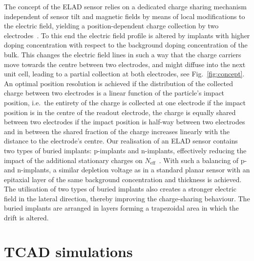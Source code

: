 \documentclass[a4paper,11pt]{article}
\begin{document}
The concept of the ELAD sensor relies on a dedicated charge sharing mechanism independent of sensor tilt and magnetic fields by means of local modifications to the electric field,
 yielding a position-dependent charge collection by two electrodes~\cite{hj}.
To this end the electric field profile is altered by implants with higher doping concentration with respect to the background doping concentration of the bulk. 
This changes the electric field lines in such a way that the charge carriers move towards the centre between two electrodes, and might diffuse into the next unit cell, leading to a partial collection at both electrodes,
 see Fig.~\ref{fig:concept}.
An optimal position resolution is achieved if the distribution of the collected charge between two electrodes is a linear function of the particle's impact position, 
 i.e.\ the entirety of the charge is collected at one electrode if the impact position is in the centre of the readout electrode,
 the charge is equally shared between two electrodes if the impact position is half-way between two electrodes
 and in between the shared fraction of the charge increases linearly with the distance to the electrode's centre.
Our realisation of an ELAD sensor contains two types of buried implants: p-implants and n-implants, effectively reducing the impact of the additional stationary charges on $N\mathrm{_{eff}}$~\cite{elad}. 
With such a balancing of p- and n-implants, a similar depletion voltage as in a standard planar sensor with an epitaxial layer of the same background concentration and thickness is achieved.
The utilisation of two types of buried implants also creates a stronger electric field in the lateral direction, thereby improving the charge-sharing behaviour.
The buried implants are arranged in layers forming a trapezoidal area in which the drift is altered. 


 

\section{TCAD simulations}
\label{sec:sim}
\end{document}
